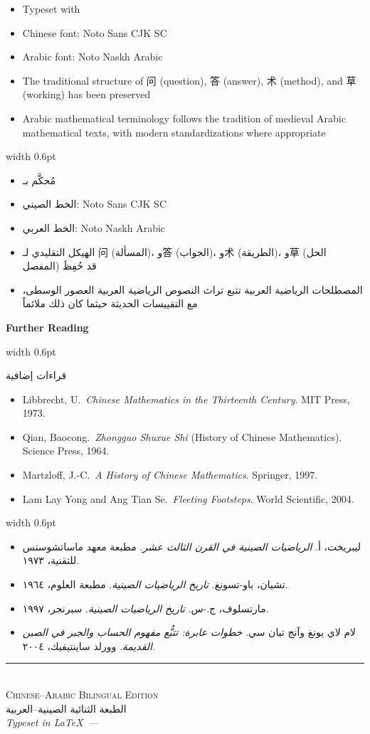 \documentclass[11pt,a4paper]{article}
\newlength{\cnwidth}
\newlength{\arwidth}
\newcommand{\paralleltext}[2]{%
  \par\medskip\noindent
  \begin{minipage}[t]{\cnwidth}%
    \small #1%
  \end{minipage}%
  \hfill\textcolor{colrule}{\vrule width 0.6pt}\hfill
  \begin{minipage}[t]{\arwidth}%
    \small\arabicfont\beginR #2\endR%
  \end{minipage}%
  \par\medskip
}
\newcommand{\parallelsubsection}[2]{%
  \par\medskip\noindent
  \begin{minipage}[t]{\cnwidth}%
    \large\bfseries\color{sectioncolor} #1%
  \end{minipage}%
  \hfill\textcolor{colrule}{\vrule width 0.6pt}\hfill
  \begin{minipage}[t]{\arwidth}%
    \large\arabicfontbf\color{sectioncolor}\beginR #2\endR%
  \end{minipage}%
  \par\smallskip
}
\begin{document}
\paralleltext{%
\begin{itemize}
  \item Typeset with \XeTeX
  \item Chinese font: Noto Sans CJK SC
  \item Arabic font: Noto Naskh Arabic
  \item The traditional structure of 问 (question), 答 (answer), 术 (method), and 草 (working) has been preserved
  \item Arabic mathematical terminology follows the tradition of medieval Arabic mathematical texts, with modern standardizations where appropriate
\end{itemize}%
}{%
\begin{itemize}
  \item مُحكَّم بـ \XeTeX
  \item الخط الصيني: Noto Sans CJK SC
  \item الخط العربي: Noto Naskh Arabic
  \item الهيكل التقليدي لـ 问 (المسألة)، و答 (الجواب)، و术 (الطريقة)، و草 (الحل المفصل) قد حُفِظَ
  \item المصطلحات الرياضية العربية تتبع تراث النصوص الرياضية العربية العصور الوسطى، مع التقييسات الحديثة حيثما كان ذلك ملائماً
\end{itemize}
}

\parallelsubsection{Further Reading}{قراءات إضافية}

\paralleltext{%
\begin{itemize}
  \item Libbrecht, U.\ \textit{Chinese Mathematics in the Thirteenth Century}. MIT Press, 1973.
  \item Qian, Baocong.\ \textit{Zhongguo Shuxue Shi} (History of Chinese Mathematics). Science Press, 1964.
  \item Martzloff, J.-C.\ \textit{A History of Chinese Mathematics}. Springer, 1997.
  \item Lam Lay Yong and Ang Tian Se.\ \textit{Fleeting Footsteps}. World Scientific, 2004.
\end{itemize}%
}{%
\begin{itemize}
  \item ليبريخت، أ. \textit{الرياضيات الصينية في القرن الثالث عشر}. مطبعة معهد ماساتشوستس للتقنية، ١٩٧٣.
  \item تشيان، باو-تسونغ. \textit{تاريخ الرياضيات الصينية}. مطبعة العلوم، ١٩٦٤.
  \item مارتسلوف، ج.-س. \textit{تاريخ الرياضيات الصينية}. سبرنجر، ١٩٩٧.
  \item لام لاي يونغ وآنج تيان سي. \textit{خطوات عابرة: تتبُّع مفهوم الحساب والجبر في الصين القديمة}. وورلد ساينتيفيك، ٢٠٠٤.
\end{itemize}
}

\vspace{2em}
\begin{center}
\textcolor{colrule}{\rule{0.5\textwidth}{0.8pt}}\\[1em]
{\large\scshape Chinese--Arabic Bilingual Edition}\\[0.3em]
{\large\arabicfont\beginR الطبعة الثنائية الصينية--العربية\endR}\\[1em]
\textit{Typeset in \LaTeX\ --- \the\year}
\end{center}
\end{document}
